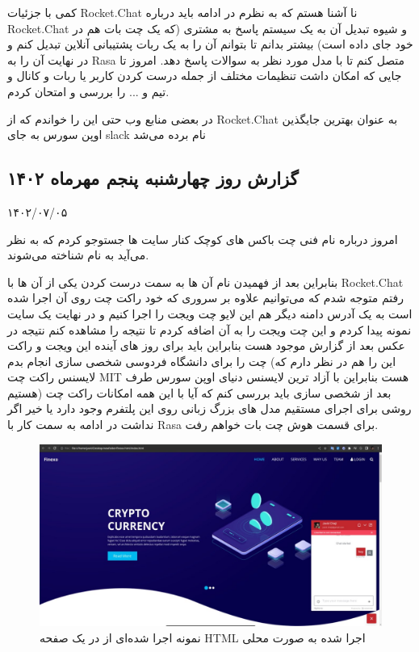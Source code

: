 کمی با جزئیات Rocket.Chat نا آشنا هستم که به نظرم در ادامه باید درباره Rocket.Chat و شیوه تبدیل آن به یک سیستم پاسخ به مشتری (که یک چت بات هم در خود جای داده است) بیشتر بدانم تا بتوانم آن را به یک ربات پشتیبانی آنلاین تبدیل کنم و در نهایت آن را به Rasa متصل کنم تا با مدل مورد نظر به سوالات پاسخ دهد.
امروز تا جایی که امکان داشت تنظیمات مختلف از جمله درست کردن کاربر یا ربات و کانال و تیم و ... را بررسی و امتحان کردم.

در بعضی منابع وب حتی این را خواندم که از Rocket.Chat به عنوان بهترین جایگذین اوپن سورس به جای slack نام برده می‌شد

\subsection{گزارش روز چهارشنبه پنجم مهرماه ۱۴۰۲}

۱۴۰۲/۰۷/۰۵

امروز درباره نام فنی چت باکس های کوچک کنار سایت ها جستوجو کردم که به نظر می‌آید به نام  شناخته می‌شوند.

بنابراین بعد از فهمیدن نام آن ها به سمت درست کردن یکی از آن ها با Rocket.Chat رفتم متوجه شدم که می‌توانیم علاوه بر سروری که خود راکت چت روی آن اجرا شده است به یک آدرس دامنه دیگر هم این لایو چت ویجت را اجرا کنیم 
و در نهایت یک سایت نمونه پیدا کردم و این چت ویجت را به آن اضافه کردم تا نتیجه را مشاهده کنم نتیجه در عکس بعد از گزارش موجود هست 
بنابراین باید برای روز های آینده این ویجت و راکت چت را برای دانشگاه فردوسی شخصی سازی انجام بدم (این را هم در نظر دارم که لایسنس راکت چت MIT هست بنابراین با آزاد ترین لایسنس دنیای اوپن سورس طرف هستیم) بعد از شخصی سازی باید بررسی کنم که آیا با این همه امکانات راکت چت روشی برای اجرای مستقیم مدل های بزرگ زبانی روی این پلتفرم وجود دارد یا خیر اگر نداشت در ادامه به سمت کار با Rasa برای قسمت هوش چت بات خواهم رفت.


\begin{figure}[h]
    \includegraphics[width=\linewidth]{Images/Working_Chat_Widget_Example.jpg}
    \caption{نمونه اجرا شده‌ای از  در یک صفحه HTML اجرا شده‌ به صورت محلی}
\end{figure}


